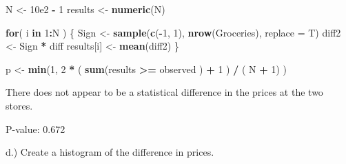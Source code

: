 \documentclass[
  12pt,
]{report}
\newenvironment{Shaded}{\begin{snugshade}}{\end{snugshade}}
\newcommand{\ControlFlowTok}[1]{\textcolor[rgb]{0.13,0.29,0.53}{\textbf{#1}}}
\newcommand{\DataTypeTok}[1]{\textcolor[rgb]{0.13,0.29,0.53}{#1}}
\newcommand{\DecValTok}[1]{\textcolor[rgb]{0.00,0.00,0.81}{#1}}
\newcommand{\FloatTok}[1]{\textcolor[rgb]{0.00,0.00,0.81}{#1}}
\newcommand{\KeywordTok}[1]{\textcolor[rgb]{0.13,0.29,0.53}{\textbf{#1}}}
\newcommand{\NormalTok}[1]{#1}
\newcommand{\OperatorTok}[1]{\textcolor[rgb]{0.81,0.36,0.00}{\textbf{#1}}}
\newcommand{\StringTok}[1]{\textcolor[rgb]{0.31,0.60,0.02}{#1}}
\begin{document}
\begin{Shaded}
\begin{Highlighting}[]
\NormalTok{N <-}\StringTok{ }\FloatTok{10e2} \OperatorTok{-}\StringTok{ }\DecValTok{1}
\NormalTok{results <-}\StringTok{ }\KeywordTok{numeric}\NormalTok{(N)}

\ControlFlowTok{for}\NormalTok{( i }\ControlFlowTok{in} \DecValTok{1}\OperatorTok{:}\NormalTok{N )}
\NormalTok{\{}
\NormalTok{   Sign <-}\StringTok{ }\KeywordTok{sample}\NormalTok{(}\KeywordTok{c}\NormalTok{(}\OperatorTok{-}\DecValTok{1}\NormalTok{, }\DecValTok{1}\NormalTok{), }\KeywordTok{nrow}\NormalTok{(Groceries), }\DataTypeTok{replace =}\NormalTok{ T)}
\NormalTok{   diff2 <-}\StringTok{ }\NormalTok{Sign }\OperatorTok{*}\StringTok{ }\NormalTok{diff}
\NormalTok{   results[i] <-}\StringTok{ }\KeywordTok{mean}\NormalTok{(diff2)}
\NormalTok{\}}

\NormalTok{p <-}\StringTok{ }\KeywordTok{min}\NormalTok{(}\DecValTok{1}\NormalTok{, }\DecValTok{2} \OperatorTok{*}\StringTok{ }\NormalTok{( }\KeywordTok{sum}\NormalTok{(results }\OperatorTok{>=}\StringTok{ }\NormalTok{observed ) }\OperatorTok{+}\StringTok{ }\DecValTok{1}\NormalTok{ ) }\OperatorTok{/}\StringTok{ }\NormalTok{( N }\OperatorTok{+}\StringTok{ }\DecValTok{1}\NormalTok{) )}
\end{Highlighting}
\end{Shaded}

There does not appear to be a statistical difference in the prices at
the two stores.

P-value: 0.672

d.) Create a histogram of the difference in prices.

\begin{Shaded}
\end{Shaded}
\end{document}
